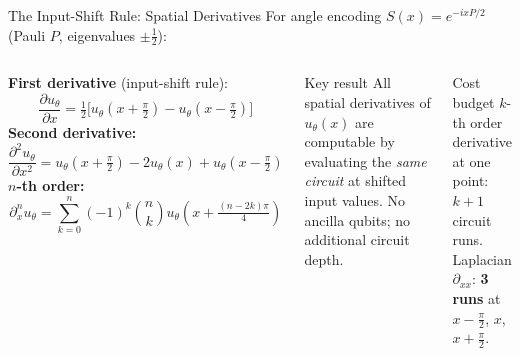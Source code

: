 \documentclass[aspectratio=169,11pt]{beamer}
\begin{document}
\begin{frame}{The Input-Shift Rule: Spatial Derivatives}
  For angle encoding $S(x) = e^{-ixP/2}$ (Pauli $P$,
  eigenvalues $\pm\frac{1}{2}$):

  \begin{columns}[T]
    \textbf{First derivative} (input-shift rule):
    \[
      \frac{\partial u_\theta}{\partial x}
      = \tfrac{1}{2}\bigl[
          u_\theta(x{+}\tfrac{\pi}{2})
         -u_\theta(x{-}\tfrac{\pi}{2})
        \bigr]
    \]
    \textbf{Second derivative:}
    \[
      \frac{\partial^2 u_\theta}{\partial x^2}
      = u_\theta(x{+}\tfrac{\pi}{2})
        - 2u_\theta(x)
        + u_\theta(x{-}\tfrac{\pi}{2})
    \]
    \textbf{$n$-th order:}
    \[
      \partial_x^n u_\theta
      = \sum_{k=0}^n(-1)^k\binom{n}{k}
        u_\theta\!\left(x+\tfrac{(n-2k)\pi}{4}\right)
    \]
    \begin{alertblock}{Key result}
      All spatial derivatives of $u_\theta(x)$ are computable
      by evaluating the \emph{same circuit} at shifted input
      values.  No ancilla qubits; no additional circuit depth.
    \end{alertblock}
    \vspace{0.15cm}
    \begin{block}{Cost budget}
      $k$-th order derivative at one point: $k+1$ circuit runs.
      \\[4pt]
      Laplacian $\partial_{xx}$: \textbf{3 runs} at
      $x{-}\tfrac\pi2$, $x$, $x{+}\tfrac\pi2$.
    \end{block}
  \end{columns}
\end{frame}
\end{document}
